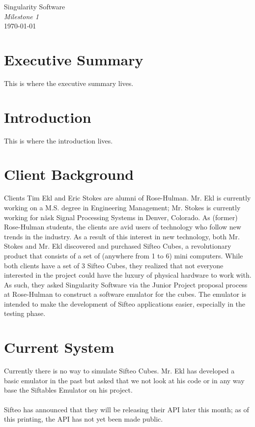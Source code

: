 \documentclass[12pt]{article}
\begin{document}
\vspace*{\fill}
        \begin{center}
                \LARGE{Singularity Software} \\
                \LARGE{\textit{Milestone 1}} \\
                \vspace{.15in}
                \large{\today} \\
        \end{center}
\vspace*{\fill}

\clearpage

\tableofcontents

\clearpage

\section{Executive Summary}
This is where the executive summary lives.

\section{Introduction}
This is where the introduction lives.

\section{Client Background}
Clients Tim Ekl and Eric Stokes are alumni of Rose-Hulman. Mr. Ekl is currently working on a M.S. degree in Engineering Management; Mr. Stokes is currently working for n\~ask Signal Processing Systems in Denver, Colorado. As (former) Rose-Hulman students, the clients are avid users of technology who follow new trends in the industry. As a result of this interest in new technology, both Mr. Stokes and Mr. Ekl discovered and purchased Sifteo Cubes, a revolutionary product that consists of a set of (anywhere from 1 to 6) mini computers. While both clients have a set of 3 Sifteo Cubes, they realized that not everyone interested in the project could have the luxury of physical hardware to work with. As such, they asked Singularity Software \- via the Junior Project proposal process at Rose-Hulman \- to construct a software emulator for the cubes. The emulator is intended to make the development of Sifteo applications easier, especially in the testing phase.

\section{Current System}
Currently there is no way to simulate Sifteo Cubes. Mr. Ekl has developed a basic emulator in the past but asked that we not look at his code or in any way base the Siftables Emulator on his project.\\\\
Sifteo has announced that they will be releasing their API later this month; as of this printing, the API has not yet been made public.
\end{document}

